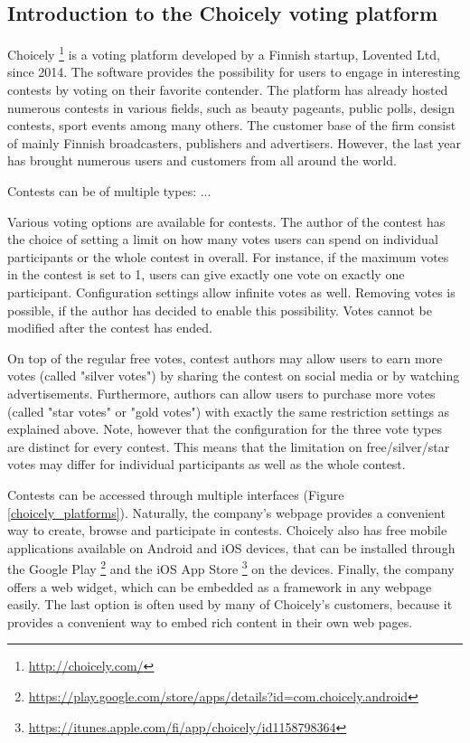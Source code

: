\subsection{Introduction to the Choicely voting platform}
    Choicely \footnote{\url{http://choicely.com/}} is a voting platform developed by a Finnish startup, Lovented Ltd, since 2014. The software provides the possibility for users to engage in interesting contests by voting on their favorite contender. The platform has already hosted numerous contests in various fields, such as beauty pageants, public polls, design contests, sport events among many others. The customer base of the firm consist of mainly Finnish broadcasters, publishers and advertisers. However, the last year has brought numerous users and customers from all around the world.
    
    Contests can be of multiple types: ... %
    
    Various voting options are available for contests. The author of the contest has the choice of setting a limit on how many votes users can spend on individual participants or the whole contest in overall. For instance, if the maximum votes in the contest is set to 1, users can give exactly one vote on exactly one participant. Configuration settings allow infinite votes as well. Removing votes is possible, if the author has decided to enable this possibility. Votes cannot be modified after the contest has ended.
    
    On top of the regular free votes, contest authors may allow users to earn more votes (called "silver votes") by sharing the contest on social media or by watching advertisements. Furthermore, authors can allow users to purchase more votes (called "star votes" or "gold votes") with exactly the same restriction settings as explained above. Note, however that the configuration for the three vote types are distinct for every contest. This means that the limitation on free/silver/star votes may differ for individual participants as well as the whole contest. 

    Contests can be accessed through multiple interfaces (Figure \ref{choicely_platforms}). Naturally, the company's webpage provides a convenient way to create, browse and participate in contests. Choicely also has free mobile applications available on Android and iOS devices, that can be installed through the Google Play \footnote{\url{https://play.google.com/store/apps/details?id=com.choicely.android}} and the iOS App Store \footnote{\url{https://itunes.apple.com/fi/app/choicely/id1158798364}} on the devices. Finally, the company offers a web widget, which can be embedded as a framework in any webpage easily. The last option is often used by many of Choicely's customers, because it provides a convenient way to embed rich content in their own web pages. 
    
